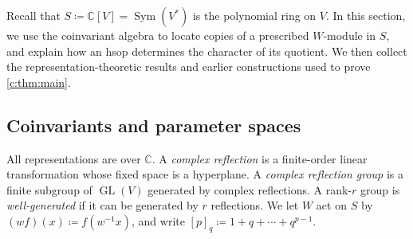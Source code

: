 \documentclass[10pt,a4paper]{amsart}
\newcommand{\defeq}{\coloneqq}
\newcommand{\defn}[1]{\emph{\color{darkblue}#1}}
\theoremstyle{definition}
\newcommand{\C}{\mathbb C}\newcommand{\Q}{\mathbb Q}
\DeclareMathOperator{\Sym}{Sym}\DeclareMathOperator{\Hom}{Hom}
\begin{document}
Recall that $S\defeq\C[V]=\Sym(V^*)$ is the polynomial ring on $V$.
In this section, we use the coinvariant algebra to locate copies of a
prescribed $W$-module in $S$, and explain how an hsop determines the
character of its quotient. We then collect the representation-theoretic
results and earlier constructions used to prove \cref{c:thm:main}.

\subsection{Coinvariants and parameter spaces}\label{b:sec:coinvariants}


All representations are over $\C$. A \defn{complex reflection} is a
finite-order linear transformation whose fixed space is a hyperplane. A
\defn{complex reflection group} is a finite subgroup of
$\operatorname{GL}(V)$ generated by complex reflections. A rank-$r$
group is \defn{well-generated} if it can be generated by $r$ reflections.
We let $W$ act on $S$ by
$(wf)(x)\defeq f(w^{-1}x)$, and write
$[p]_q\defeq1+q+\cdots+q^{p-1}$.
\end{document}
